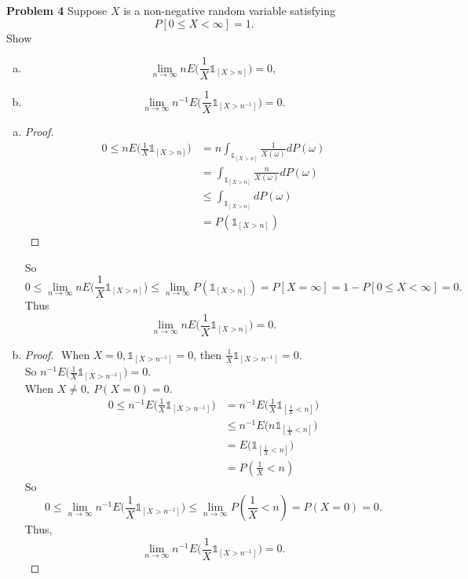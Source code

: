 \documentclass{article}
\newcommand{\idca}{\mathbb{1}}
\begin{document}
\noindent \textbf{Problem 4} Suppose $X$ is a non-negative random variable satisfying 
\[ P[0 \leq X < \infty] = 1.\]
Show
\begin{enumerate}[(a)]
	\item 
	  \[ \lim_{n \to \infty } n E\Big( \frac{1}{X}\idca_{[X>n]} \Big)  = 0,\]
	\item
	  \[ \lim_{n \to \infty } n^{-1} E\Big( \frac{1}{X}\idca_{[X>n^{-1}]} \Big)  = 0.\]
\end{enumerate}

\begin{enumerate}[(a)]
	\item 	
		\begin{proof}
			\begin{align*}
			  0\leq nE\Big( \frac{1}{X}\idca_{[X>n]}\Big) &= n \int_{\idca_{[X>n]}} \frac{1}{X(\omega)}dP(\omega) \\
		 					  				  			  &= \int_{\idca_{[X>n]}} \frac{n}{X(\omega)}dP(\omega) \\
			  										      & \leq \int_{\idca_{[X>n]}}dP(\omega) \\
			  										      &= P(\idca_{[X>n]})
			\end{align*}
		\end{proof}
		So 
		\[0\leq \lim_{n \to \infty} nE\Big( \frac{1}{X}\idca_{[X>n]}\Big) \leq \lim_{n \to \infty} P(\idca_{[X>n]}) = P[X=\infty] = 1- P[0 \leq X < \infty]  =0.\]
		Thus 
		\[\lim_{n \to \infty} nE\Big( \frac{1}{X}\idca_{[X>n]}\Big) = 0. \]
	\item
	  \begin{proof}
	  	$ $\newline
		When $X = 0, \idca_{[X>n^{-1}]} = 0$, then $\frac{1}{X} \idca_{[X>n^{-1}]} = 0$.\\
	  	So $n^{-1}E\big(\frac{1}{X} \idca_{[X>n^{-1}]}\big) = 0$. \\
		When $X \neq 0,~ P(X=0) = 0$.
		\begin{align*}
		 0\leq  n^{-1}E\Big(\frac{1}{X} \idca_{[X>n^{-1}]}\Big) &= n^{-1}E\Big(\frac{1}{X} \idca_{[\frac{1}{X}<n]}\Big) \\
		  												& \leq n^{-1}E\Big(n \idca_{[\frac{1}{X}<n]}\Big)\\
		  												&= E\Big(\idca_{[\frac{1}{X}<n]}\Big) \\
		  												&= P(\frac{1}{X}<n) 
		\end{align*}
		So 
	  \[0\leq \lim_{n \to \infty}n^{-1}E\Big(\frac{1}{X} \idca_{[X>n^{-1}]}\Big) \leq \lim_{n \to \infty} P(\frac{1}{X}<n) = P(X=0) = 0. \]
		Thus,
		\[\lim_{n \to \infty } n^{-1} E\Big( \frac{1}{X}\idca_{[X>n^{-1}]} \Big)  = 0.\]
	  \end{proof}
\end{enumerate}
\end{document}
